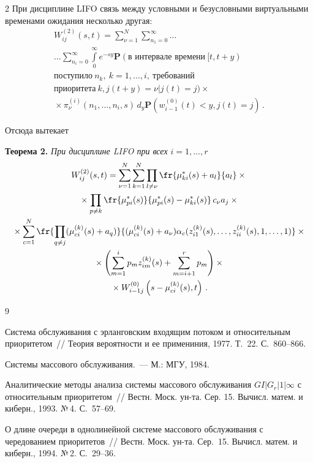 \begin{multicols}{2}
При дисциплине LIFO связь между условными и безусловными виртуальными временами 
ожидания несколько другая:
\begin{multline*}
W_{ij}^{(2)}(s,t)=\sum\limits_{\nu=1}^N\sum\limits_{n_1=0}^{\infty}\ldots{}\\[3pt]
{}\ldots\sum\limits_{n_i=0}^{\infty}\int\limits_0^{\infty}
e^{-sy}\mathbf{P}(\mbox{в интервале времени}\ [t,t+y)\\[3pt]
 \mbox{поступило}\ n_k,\:k=1,\ldots,i,\ \mbox{требований}\\[3pt]
 \mbox{приоритета}\ k,  j(t+y)=\nu|j(t)=j)\times{}\\[3pt]
 {}\times\pi_{\nu}^{(i)}\left(n_1,\ldots,n_i,s\right)\,d_y
 \mathbf{P}(w_{i-1}^{(0)}(t)<y,j(t)=j)\,.
\end{multline*}

Отсюда вытекает

\medskip

\noindent
\textbf{Теорема 2.} \textit{При дисциплине LIFO при всех $i=1,\ldots,r$}
\begin{multline*}
W_{ij}^{(2)}(s,t)=\sum\limits_{\nu=1}^N\sum\limits_{k=1}^N
\prod_{l\ne \nu}\fr{\mu_{ki}^{*}(s)+a_l}{a_l}\times{}\\
{}\times
\prod_{p\ne k}\fr{\mu_{pi}^{*}(s)}{\mu_{pi}^{*}(s)-\mu_{ki}^{*}(s)}\,c_{\nu}a_j\times{}\\
{}\times
\sum\limits_{c=1}^N\fr{\prod\limits_{q\ne j}(\mu_{ci}^{(k)}(s)+a_q)}
{(\mu_{ci}^{(k)}(s)+a_{\nu})\alpha_c(z_{i1}^{(k)}(s),\ldots,z_{ii}^{(k)}(s),1,\ldots,1)}\times{}\\
{}\times 
\left(\sum\limits_{m=1}^i p_mz_{im}^{(k)}(s)+\sum\limits_{m=i+1}^r p_m\right)\times{}\\
{}\times W_{i-1j}^{(0)}
\left(s-\mu_{ci}^{(k)}(s),t\right)\,.
\end{multline*}

{\small\frenchspacing
{%
\begin{thebibliography}{9}

 Система обслуживания с эрланговским входящим
потоком и относительным приоритетом~// Теория вероятности и ее примениния,
1977. Т.~22. С.~860--866.

 Системы массового обслуживания.~--- М.: МГУ, 1984.

 Аналитические методы анализа системы массового
обслуживания $GI|G_r|1|\infty$ с относительным приоритетом~// Вестн.
Моск. ун-та. Сер. 15. Вычисл. матем. и киберн., 1993. №\,4.
С.~57--69.

\label{end\stat}

  О длине очереди в однолинейной системе
массового обслуживания с чередованием приоритетов~// Вестн. Моск.
ун-та. Сер.~15. Вычисл. матем. и киберн., 1994. №\,2. С.~29--36.
 \end{thebibliography}
}
}


\end{multicols}       
